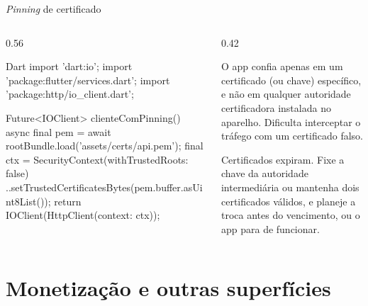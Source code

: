 \documentclass[aspectratio=169,10pt]{beamer}
\begin{document}
\begin{frame}[fragile]{\emph{Pinning} de certificado}
  \begin{columns}[T]
    \begin{column}{0.56\textwidth}
\begin{codigo}[title=Só aceitar o certificado da API do LabMonitor]{Dart}
import 'dart:io';
import 'package:flutter/services.dart';
import 'package:http/io_client.dart';

Future<IOClient> clienteComPinning() async {
  final pem = await rootBundle.load('assets/certs/api.pem');
  final ctx = SecurityContext(withTrustedRoots: false)
    ..setTrustedCertificatesBytes(pem.buffer.asUint8List());
  return IOClient(HttpClient(context: ctx));
}
\end{codigo}
    \end{column}
    \begin{column}{0.42\textwidth}
      \begin{definicao}
        O app confia apenas em um certificado (ou chave) específico, e não em qualquer autoridade certificadora instalada no aparelho. Dificulta interceptar o tráfego com um certificado falso.
      \end{definicao}
      \begin{atencao}
        Certificados expiram. Fixe a chave da autoridade intermediária ou mantenha dois certificados válidos, e planeje a troca antes do vencimento, ou o app para de funcionar.
      \end{atencao}
    \end{column}
  \end{columns}
\end{frame}

\section{Monetização e outras superfícies}
\end{document}
